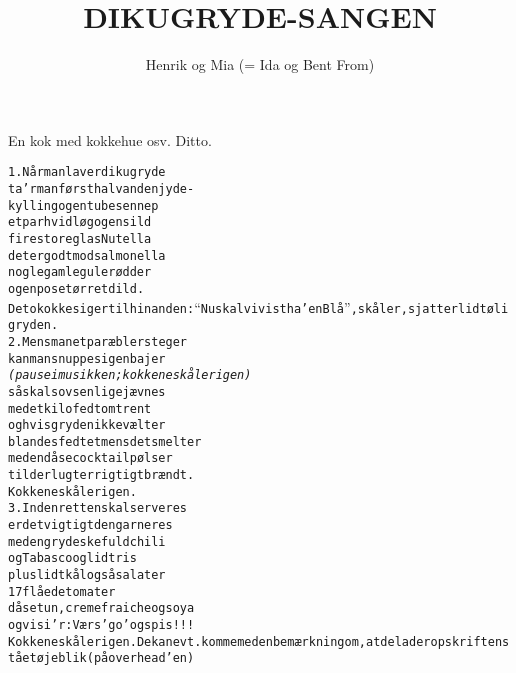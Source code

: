 \documentclass[a4paper,11pt]{article}
\title{DIKUGRYDE-SANGEN}
\author{Henrik og Mia (= Ida og Bent From)}
\begin{document}
\maketitle
\begin{roles}
 En kok med kokkehue osv.
 Ditto.
\end{roles}
\begin{alltt}
\rm
1.      N\aa{}r man laver dikugryde
        ta'r man f\o{}rst halvanden jyde-
        kylling og en tube sennep
        et par hvidl\o{}g og en sild
        fire store glas Nutella
        det er godt mod salmonella
        nogle gamle guler\o{}dder
        og en pose t\o{}rret dild.
\scene
        {De to kokke siger til hinanden:``Nu skal vi vist ha' en Bl\aa{}'', sk\aa{}ler, sjatter lidt \o{}l i gryden.}
\rm
2.      Mens man et par \ae{}bler steger
        kan man snuppe sig en bajer
        {\em (pause i musikken; kokkene sk\aa{}ler igen)}
        s\aa{} skal sovsen lige j\ae{}vnes
        med et kilo fedt omtrent
        og hvis gryden ikke v\ae{}lter
        blandes fedtet mens det smelter
        med en d\aa{}se cocktailp\o{}lser
        til der lugter rigtigt br\ae{}ndt.
\scene
        {Kokkene sk\aa{}ler igen.}
\rm
3.      Inden retten skal serveres
        er det vigtigt den garneres
        med en grydeskefuld chili
        og Tabasco og lidt ris
        plus lidt k\aa{}l og s\aa{} salater
        17 fl\aa{}ede tomater
        d\aa{}setun, creme fraiche og soya
        og vi si'r: V\ae{}rs'go' og spis!!!
\scene
        {Kokkene sk\aa{}ler igen. De kan evt. komme med en bem\ae{}rkning om, at de lader opskriften st\aa{} et \o{}jeblik (p\aa{} overhead'en)}
\rm
\end{alltt}
\end{document}
